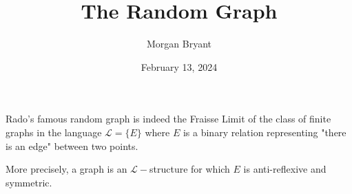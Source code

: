 \documentclass[a4paper]{article}
\title{The Random Graph}
\date{February 13, 2024}
\author{Morgan Bryant}
\begin{document}
\maketitle
\par{Rado's famous random graph is indeed the Fraisse Limit of the class of finite graphs in the language \(\mathcal {L} =  \{ E \}\) where \(E\) is a binary relation representing "there is an edge" between two points.}\par{More precisely, a graph is an \(\mathcal {L}-\)structure for which \(E\) is anti-reflexive and symmetric.}
\printbibliography
\end{document}
